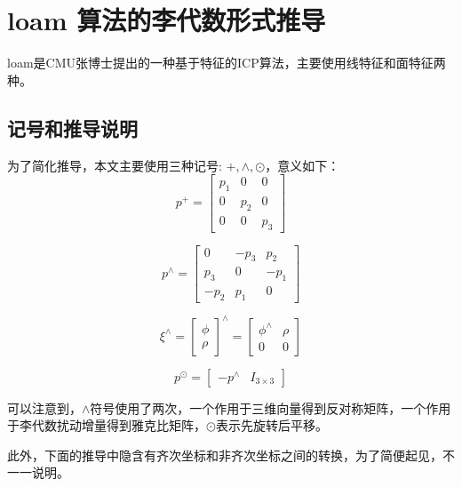 \section{loam 算法的李代数形式推导}
\newcommand{\vecba}[1]{\boldmath\overrightarrow{#1}\unboldmath}
loam是CMU张博士提出的一种基于特征的ICP算法，主要使用线特征和面特征两种。
\subsection{记号和推导说明}
为了简化推导，本文主要使用三种记号: $+,\wedge,\odot$，意义如下：
\begin{equation}
	p^+=\begin{bmatrix}
		p_1 & 0   & 0   \\
		0   & p_2 & 0   \\
		0   & 0   & p_3
	\end{bmatrix}
\end{equation}

\begin{equation}
	p^\wedge=\begin{bmatrix}
		0    & -p_3 & p_2  \\
		p_3  & 0    & -p_1 \\
		-p_2 & p_1  & 0
	\end{bmatrix}
\end{equation}

\begin{equation}
	\xi^\wedge
	=\begin{bmatrix}
		\phi \\ \rho
	\end{bmatrix}^\wedge
	=\begin{bmatrix}
		\phi^\wedge & \rho \\
		0           & 0
	\end{bmatrix}
\end{equation}

\begin{equation}
	p^\odot=\begin{bmatrix}
		-p^\wedge & I_{3\times3}
	\end{bmatrix}
\end{equation}

\par 可以注意到，$\wedge$符号使用了两次，一个作用于三维向量得到反对称矩阵，一个作用于李代数扰动增量得到雅克比矩阵，$\odot$表示先旋转后平移。
\par 此外，下面的推导中隐含有齐次坐标和非齐次坐标之间的转换，为了简便起见，不一一说明。

